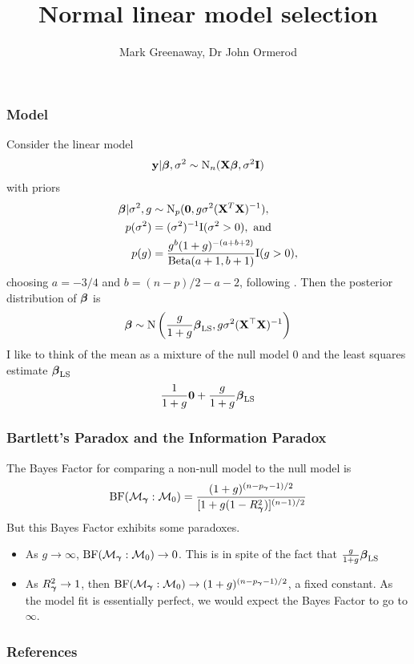 \documentclass{beamer}
\title{Normal linear model selection}
\author{Mark Greenaway, Dr John Ormerod}
\begin{document}
\begin{frame}
	\titlepage
\end{frame}
			
\begin{frame}
	\frametitle{Model}
	Consider the linear model
	\begin{align*}
		{\bf y} | {\boldsymbol \beta}, \sigma^2 \sim \text{N}_n({\bf X} {\boldsymbol \beta}, \sigma^2 {\bf I}) 
	\end{align*}
	with priors
	\begin{align*}
		{\boldsymbol\beta} | \sigma^2, g & \sim \text{N}_p({\bf 0}, g \sigma^2 ({\bf X}^T {\bf X})^{-1}),                     \\
		p(\sigma^2)          & = (\sigma^2)^{-1} \text{I}(\sigma^2 > 0), \text{ and }                    \\
		p(g)                 & = \frac{g^b (1 + g)^{-(a + b + 2)}}{\text{Beta}(a + 1, b + 1)} \text{I}(g > 0), 
	\end{align*}
	choosing $a = -3/4$ and $b = (n-p)/2 - a - 2$, following \citep{Maruyama2011}.
	Then the posterior distribution of ${\boldsymbol \beta}$ is
	\[
		{\boldsymbol \beta} \sim \text{N}\left(\frac{g}{1 + g} {\boldsymbol \beta}_{\text{LS}}, g \sigma^2 ({\bf X}^\top {\bf X})^{-1}\right)
	\]
	I like to think of the mean as a mixture of the null model $0$ and the least squares estimate ${\boldsymbol \beta}_{\text{LS}}$
	\[
		\frac{1}{1 + g} {\bf 0} + \frac{g}{1 + g} {\boldsymbol \beta}_{\text{LS}}
	\]
\end{frame}

\begin{frame}
	\frametitle{Bartlett's Paradox and the Information Paradox}
	The Bayes Factor for comparing a non-null model to the null model is
	\[
		\text{BF}(\mathcal{M}_{\boldsymbol \gamma} : \mathcal{M}_0) = \frac{(1 + g)^{(n - p_{\boldsymbol \gamma} - 1)/2}}{[1 + g (1 - R_{\boldsymbol \gamma}^2)]^{(n - 1)/2}}
	\]
	But this Bayes Factor exhibits some paradoxes.
	\begin{itemize}
		\item As $g \to \infty$, $\text{BF}(\mathcal{M}_{\boldsymbol \gamma} : \mathcal{M}_0) \to 0$. This is in spite of the fact
					that $\frac{g}{1 + g} {\boldsymbol \beta}_{\text{LS}}$
		\item As $R_{\boldsymbol \gamma}^2 \to 1$, then 
					$\text{BF}(\mathcal{M}_{\boldsymbol \gamma} : \mathcal{M}_0) \to (1 + g)^{(n - p_{\boldsymbol \gamma} - 1)/2}$, a fixed constant.
					As the model fit is essentially perfect, we would expect the Bayes Factor to go to $\infty$.
	\end{itemize}

\end{frame}



\begin{frame}
	\frametitle{References}
	
	
\end{frame}
			
\end{document}
